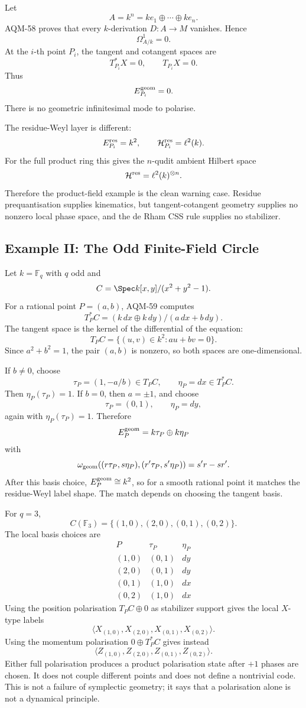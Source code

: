 Let
\[
  A=k^n=k e_1\oplus\cdots\oplus k e_n .
\]
AQM-58 proves that every \(k\)-derivation \(D:A\to M\) vanishes.  Hence
\[
  \Omega^1_{A/k}=0.
\]
At the \(i\)-th point \(P_i\), the tangent and cotangent spaces are
\[
  T_{P_i}^*X=0,\qquad T_{P_i}X=0.
\]
Thus
\[
  E_{P_i}^{\rm geom}=0.
\]
There is no geometric infinitesimal mode to polarise.

The residue-Weyl layer is different:
\[
  E_{P_i}^{\rm res}=k^2,\qquad \mathcal H_{P_i}^{\rm res}=\ell^2(k).
\]
For the full product ring this gives the \(n\)-qudit ambient Hilbert space
\[
  \mathcal H^{\rm res}=\ell^2(k)^{\otimes n}.
\]
Therefore the product-field example is the clean warning case.  Residue
prequantisation supplies kinematics, but tangent-cotangent geometry supplies no
nonzero local phase space, and the de Rham CSS rule supplies no stabilizer.

\subsection{Example II: The Odd Finite-Field Circle}

Let \(k=\mathbb F_q\) with \(q\) odd and
\[
  C=\Spec k[x,y]/(x^2+y^2-1).
\]
For a rational point \(P=(a,b)\), AQM-59 computes
\[
  T_P^*C=(k\,dx\oplus k\,dy)/(a\,dx+b\,dy).
\]
The tangent space is the kernel of the differential of the equation:
\[
  T_PC=\{(u,v)\in k^2:au+bv=0\}.
\]
Since \(a^2+b^2=1\), the pair \((a,b)\) is nonzero, so both spaces are
one-dimensional.

If \(b\ne0\), choose
\[
  \tau_P=(1,-a/b)\in T_PC,\qquad \eta_P=dx\in T_P^*C .
\]
Then \(\eta_P(\tau_P)=1\).  If \(b=0\), then \(a=\pm1\), and choose
\[
  \tau_P=(0,1),\qquad \eta_P=dy,
\]
again with \(\eta_P(\tau_P)=1\).  Therefore
\[
  E_P^{\rm geom}=k\tau_P\oplus k\eta_P
\]
with
\[
  \omega_{\rm geom}((r\tau_P,s\eta_P),(r'\tau_P,s'\eta_P))
  =s'r-sr'.
\]
After this basis choice, \(E_P^{\rm geom}\cong k^2\), so for a smooth rational
point it matches the residue-Weyl label shape.  The match depends on choosing
the tangent basis.

For \(q=3\),
\[
  C(\mathbb F_3)=\{(1,0),(2,0),(0,1),(0,2)\}.
\]
The local basis choices are
\[
\begin{array}{c|c|c}
P & \tau_P & \eta_P\\ \hline
(1,0)&(0,1)&dy\\
(2,0)&(0,1)&dy\\
(0,1)&(1,0)&dx\\
(0,2)&(1,0)&dx
\end{array}
\]
Using the position polarisation \(T_PC\oplus0\) as stabilizer support gives
the local \(X\)-type labels
\[
  \langle X_{(1,0)},X_{(2,0)},X_{(0,1)},X_{(0,2)}\rangle .
\]
Using the momentum polarisation \(0\oplus T_P^*C\) gives instead
\[
  \langle Z_{(1,0)},Z_{(2,0)},Z_{(0,1)},Z_{(0,2)}\rangle .
\]
Either full polarisation produces a product polarisation state after \(+1\)
phases are chosen.  It does not couple different points and does not define a
nontrivial code.  This is not a failure of symplectic geometry; it says that a
polarisation alone is not a dynamical principle.

